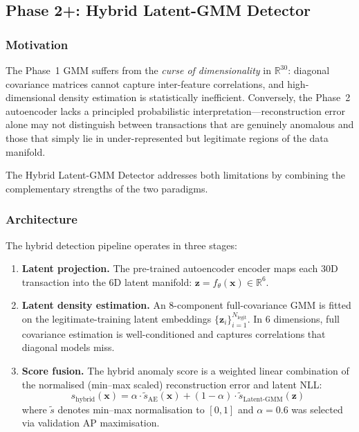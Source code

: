 \documentclass[conference,10pt]{IEEEtran}
\begin{document}
\subsection{Phase 2+: Hybrid Latent-GMM Detector}
\label{subsec:hybrid}

\subsubsection{Motivation}
The Phase~1 GMM suffers from the \emph{curse of dimensionality} in
$\mathbb{R}^{30}$: diagonal covariance matrices cannot capture inter-feature
correlations, and high-dimensional density estimation is statistically
inefficient.  Conversely, the Phase~2 autoencoder lacks a principled
probabilistic interpretation---reconstruction error alone may not distinguish
between transactions that are genuinely anomalous and those that simply lie
in under-represented but legitimate regions of the data manifold.

The Hybrid Latent-GMM Detector addresses both limitations by combining the
complementary strengths of the two paradigms.

\subsubsection{Architecture}
The hybrid detection pipeline operates in three stages:
\begin{enumerate}[leftmargin=*]
\item \textbf{Latent projection.}  The pre-trained autoencoder encoder maps
      each 30D transaction into the 6D latent manifold:
      $\mathbf{z} = f_\theta(\mathbf{x}) \in \mathbb{R}^6$.
\item \textbf{Latent density estimation.}  An 8-component full-covariance GMM
      is fitted on the legitimate-training latent embeddings
      $\{\mathbf{z}_i\}_{i=1}^{N_{\text{legit}}}$.  In 6 dimensions,
      full covariance estimation is well-conditioned and captures correlations
      that diagonal models miss.
\item \textbf{Score fusion.}  The hybrid anomaly score is a weighted linear
      combination of the normalised (min--max scaled) reconstruction error and
      latent NLL:
      \begin{equation}
      s_{\text{hybrid}}(\mathbf{x}) = \alpha \cdot
          \tilde{s}_{\text{AE}}(\mathbf{x}) + (1 - \alpha) \cdot
          \tilde{s}_{\text{Latent-GMM}}(\mathbf{z})
      \label{eq:hybrid}
      \end{equation}
      where $\tilde{s}$ denotes min--max normalisation to $[0, 1]$ and
      $\alpha = 0.6$ was selected via validation AP maximisation.
\end{enumerate}
\end{document}
